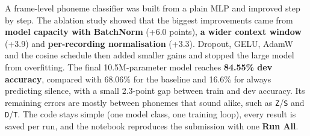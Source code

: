 \documentclass[11pt,a4paper]{article}
\begin{document}
A frame-level phoneme classifier was built from a plain MLP and improved step by step. The ablation study
showed that the biggest improvements came from \textbf{model capacity with BatchNorm} (+6.0 points),
\textbf{a wider context window} (+3.9) and \textbf{per-recording normalisation} (+3.3). Dropout, GELU,
AdamW and the cosine schedule then added smaller gains and stopped the large model from overfitting. The
final 10.5M-parameter model reaches \textbf{84.55\% dev accuracy}, compared with 68.06\% for the baseline
and 16.6\% for always predicting silence, with a small 2.3-point gap between train and dev accuracy. Its
remaining errors are mostly between phonemes that sound alike, such as \texttt{Z}/\texttt{S} and
\texttt{D}/\texttt{T}. The code stays simple (one model class, one training loop), every result is saved
per run, and the notebook reproduces the submission with one \textbf{Run All}.
\end{document}
